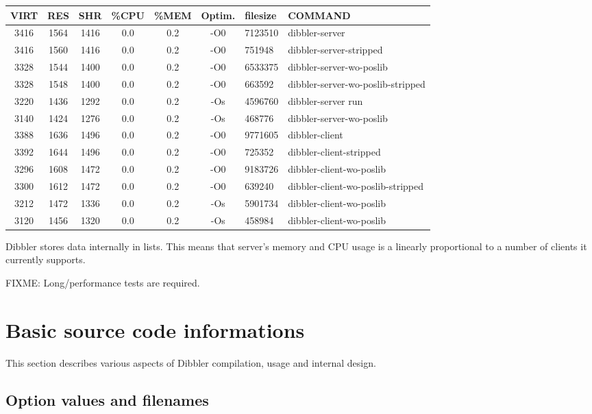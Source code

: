 \begin{center}
\begin{tabular}{|c|c|c|c|c|c|l|l|}
\hline
VIRT & RES& SHR & \%CPU &\%MEM&Optim.&filesize&COMMAND \\
\hline
3416&1564&1416 &  0.0 & 0.2 & -O0 & 7123510 & dibbler-server\\
3416&1560&1416 &  0.0 & 0.2 & -O0 & 751948  & dibbler-server-stripped\\
3328&1544&1400 &  0.0 & 0.2 & -O0 & 6533375 & dibbler-server-wo-poslib\\
3328&1548&1400 &  0.0 & 0.2 & -O0 & 663592  & dibbler-server-wo-poslib-stripped\\
3220&1436&1292 &  0.0 & 0.2 & -Os & 4596760 & dibbler-server run\\
3140&1424&1276 &  0.0 & 0.2 & -Os & 468776  & dibbler-server-wo-poslib\\
3388&1636&1496 &  0.0 & 0.2 & -O0 & 9771605 & dibbler-client\\
3392&1644&1496 &  0.0 & 0.2 & -O0 & 725352  & dibbler-client-stripped\\
3296&1608&1472 &  0.0 & 0.2 & -O0 & 9183726 & dibbler-client-wo-poslib\\
3300&1612&1472 &  0.0 & 0.2 & -O0 & 639240  & dibbler-client-wo-poslib-stripped\\
3212&1472&1336 &  0.0 & 0.2 & -Os & 5901734 & dibbler-client-wo-poslib\\
3120&1456&1320 &  0.0 & 0.2 & -Os & 458984  & dibbler-client-wo-poslib\\
\hline
\end{tabular}
\end{center}

Dibbler stores data internally in lists. This means that server's
memory and CPU usage is a linearly proportional to a number of clients
it currently supports.

FIXME: Long/performance tests are required.

\section{Basic source code informations}
This section describes various aspects of Dibbler compilation, usage
and internal design.

\subsection{Option values and filenames}

